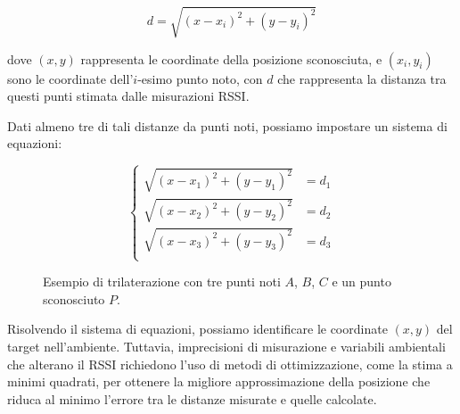 \begin{equation}
    d = \sqrt{(x-x_i)^2 + (y-y_i)^2}
\end{equation}

\noindent dove $(x,y)$ rappresenta le coordinate della posizione sconosciuta, e $(x_i,y_i)$ sono le coordinate dell'$i$-esimo punto noto, con $d$ che rappresenta la distanza tra questi punti stimata dalle misurazioni RSSI.

Dati almeno tre di tali distanze da punti noti, possiamo impostare un sistema di equazioni:

\begin{equation}
    \begin{cases}
        \sqrt{(x-x_1)^2 + (y-y_1)^2} &= d_1 \\
        \sqrt{(x-x_2)^2 + (y-y_2)^2} &= d_2 \\
        \sqrt{(x-x_3)^2 + (y-y_3)^2} &= d_3 \\
    \end{cases}
\end{equation}

\begin{wrapfigure}{r}{0.5\textwidth}
    \centering
    \caption{Esempio di trilaterazione con tre punti noti $A$, $B$, $C$ e un punto sconosciuto $P$.}
    \label{fig:trilaterazione}
\end{wrapfigure}


Risolvendo il sistema di equazioni, possiamo identificare le coordinate $(x,y)$ del target nell'ambiente. Tuttavia, imprecisioni di misurazione e variabili ambientali che alterano il RSSI richiedono l'uso di metodi di ottimizzazione, come la stima a minimi quadrati, per ottenere la migliore approssimazione della posizione che riduca al minimo l'errore tra le distanze misurate e quelle calcolate.

